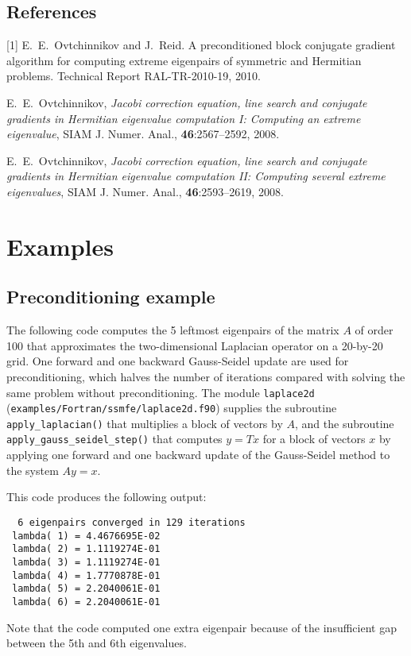 \subsection*{References}

[1]
E.~E.~Ovtchinnikov and J.~Reid.
A preconditioned block conjugate gradient
algorithm for computing extreme eigenpairs
of symmetric and Hermitian problems.
Technical Report RAL-TR-2010-19, 2010.

\noindent
[2]
E.~E.~Ovtchinnikov,
{\em Jacobi correction equation, line search and
conjugate gradients in Hermitian eigenvalue computation I:
Computing an extreme eigenvalue},
SIAM J. Numer. Anal., {\bf 46}:2567--2592, 2008.

\noindent
[3]
E.~E.~Ovtchinnikov,
{\em Jacobi correction equation, line search and
conjugate gradients in Hermitian eigenvalue computation II:
Computing several extreme eigenvalues},
SIAM J. Numer. Anal., {\bf 46}:2593--2619, 2008.

\section{Examples}

\subsection{Preconditioning example}

The following code 
computes the 5 leftmost eigenpairs of 
the matrix $A$ of order 100 that approximates 
the two-dimensional Laplacian operator
on a 20-by-20 grid.
One forward and one backward Gauss-Seidel update
are used for preconditioning,
which halves the number of iterations
compared with solving the same problem without preconditioning.
The module {\tt laplace2d} (\texttt{examples/Fortran/ssmfe/laplace2d.f90})
supplies the subroutine {\tt apply\_laplacian()}
that multiplies a block of vectors by $A$,
and the subroutine 
{\tt apply\_gauss\_seidel\_step()}
that computes $y = T x$ for a block of vectors $x$
by applying one forward and one backward update
of the Gauss-Seidel method to the system $A y = x$.

This code produces the following output:
\begin{verbatim}
  6 eigenpairs converged in 129 iterations
 lambda( 1) = 4.4676695E-02
 lambda( 2) = 1.1119274E-01
 lambda( 3) = 1.1119274E-01
 lambda( 4) = 1.7770878E-01
 lambda( 5) = 2.2040061E-01
 lambda( 6) = 2.2040061E-01
\end{verbatim}

Note that the code computed one extra eigenpair
because of the insufficient gap between the 5th and 6th
eigenvalues.
